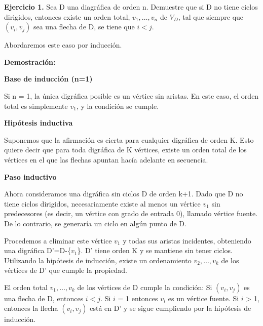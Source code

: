 
\textbf{Ejercicio 1.} Sea D una diagráfica de orden n. Demuestre que si D 
no tiene ciclos dirigidos, entonces existe un orden total, $v_1,\dots,v_n$ 
de $V_D$, tal que siempre que $(v_i,v_j)$ sea una flecha de D, se tiene que $i<j$.

Abordaremos este caso por inducción.

\textbf{Demostración:}

\textbf{Base de inducción (n=1)}

Si n = 1, la única digráfica posible es un vértice sin aristas. En este caso, el orden total es simplemente $v_1$, y la condición se cumple.

\textbf{Hipótesis inductiva}

Suponemos que la afirmación es cierta para cualquier digráfica de orden K. Esto quiere decir que para toda digráfica de K vértices, existe un orden total de los vértices en el que las flechas apuntan hacía adelante en secuencia.

\textbf{Paso inductivo}

Ahora consideramos una digráfica sin ciclos D de orden k+1. Dado que D no tiene ciclos dirigidos, necesariamente existe al menos un vértice $v_1$ sin predecesores (es decir, un vértice con grado de entrada 0), llamado vértice fuente. De lo contrario, se generaría un ciclo en algún punto de D.

Procedemos a eliminar este vértice $v_1$ y todas sus aristas incidentes, obteniendo una digráfica D'=D-\{$v_1$\}. D' tiene orden K y se mantiene sin tener ciclos. Utilizando la hipótesis de inducción, existe un ordenamiento $v_2,\dots,v_k$ de los vértices de D' que cumple la propiedad.

El orden total $v_1,\dots,v_k$ de los vértices de D cumple la condición:
Si $(v_i,v_j)$ es una flecha de D, entonces $i<j$. Si $i$ = 1 entonces $v_i$ es un vértice fuente. Si $i$ > 1, entonces la flecha $(v_i,v_j)$ está en D' y se sigue cumpliendo por la hipótesis de inducción.

\QED